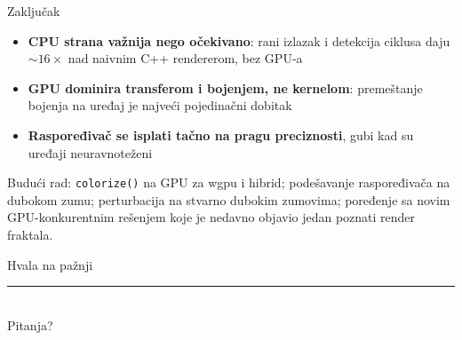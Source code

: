 \documentclass[aspectratio=169,11pt]{beamer}
\newcommand{\code}[1]{\texttt{\color{accent!80!black}#1}}
\begin{document}
\begin{frame}{Zaključak}
  \begin{itemize}
    \item \textbf{CPU strana važnija nego očekivano}: rani izlazak i detekcija ciklusa daju $\sim\!16\times$ nad naivnim C++ rendererom, bez GPU-a
    \item \textbf{GPU dominira transferom i bojenjem, ne kernelom}: premeštanje bojenja na uređaj je najveći pojedinačni dobitak
    \item \textbf{Raspoređivač se isplati tačno na pragu preciznosti}, gubi kad su uređaji neuravnoteženi
  \end{itemize}
  \vspace{0.5em}
  {\scriptsize\color{graytext} Budući rad: \code{colorize()} na GPU za wgpu i hibrid; podešavanje raspoređivača na dubokom zumu; perturbacija na stvarno dubokim zumovima; poređenje sa novim GPU-konkurentnim rešenjem koje je nedavno objavio jedan poznati render fraktala.}
\end{frame}

\begin{frame}[plain]
  \vspace{2.0cm}
  \begin{center}
    {\color{accent} Hvala na pažnji}\\[1.2em]
    {\color{accent}\rule{0.12\textwidth}{2pt}}\\[1.2em]
    {\large\color{graytext} Pitanja?}
  \end{center}
\end{frame}
\end{document}
